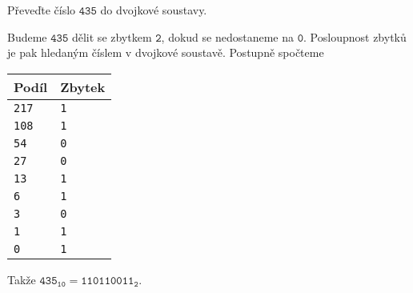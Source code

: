 \documentclass[a4paper,12pt,answers]{exam}
\begin{document}
\begin{questions}
 \question Převeďte číslo $\mathtt{435}$ do dvojkové soustavy.
 \begin{solution}
  Budeme $\mathtt{435}$ dělit se zbytkem $\mathtt{2}$, dokud se nedostaneme na
  $\mathtt{0}$. Posloupnost zbytků je pak hledaným číslem v dvojkové soustavě.
  Postupně spočteme
  \begin{center}
  {\def\arraystretch{0.9}
   \begin{tabular}{
    >{\centering\arraybackslash}p{1.5cm}|
    >{\centering\arraybackslash}p{1.5cm}
   }
    \textbf{Podíl} & \textbf{Zbytek}\\
    \toprule
    \texttt{217} & \texttt{1}\\
    \midrule
    \texttt{108} & \texttt{1}\\
    \midrule
    \texttt{54} & \texttt{0}\\
    \midrule
    \texttt{27} & \texttt{0}\\
    \midrule
    \texttt{13} & \texttt{1}\\
    \midrule
    \texttt{6} & \texttt{1}\\
    \midrule
    \texttt{3} & \texttt{0}\\
    \midrule
    \texttt{1} & \texttt{1}\\
    \midrule
    \texttt{0} & \texttt{1}
   \end{tabular}
  }
  \end{center}
  Takže $\mathtt{435_{10}} = \mathtt{110110011_2}$.
 \end{solution}
\end{questions}
\end{document}
